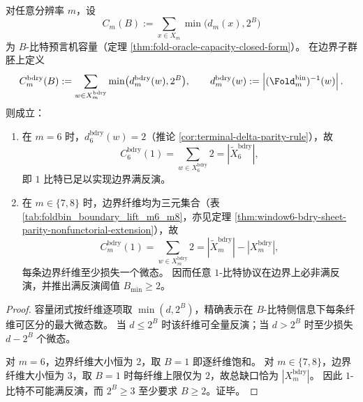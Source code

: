 \begin{proposition}\label{prop:conclusion-boundary-uplift-min-register-by-oracle-capacity}
对任意分辨率 \(m\)，设
\[
C_m(B):=\sum_{x\in X_m}\min\bigl(d_m(x),2^B\bigr)
\]
为 \(B\)-比特预言机容量（定理 \ref{thm:fold-oracle-capacity-closed-form}）。
在边界子群胚上定义
\[
C_m^{\mathrm{bdry}}(B):=\sum_{w\in X_m^{\mathrm{bdry}}}\min\bigl(d_m^{\mathrm{bdry}}(w),2^B\bigr),
\qquad
d_m^{\mathrm{bdry}}(w):=\left|(\Fold_m^{\mathrm{bin}})^{-1}(w)\right|.
\]
则成立：
\begin{enumerate}
  \item 在 \(m=6\) 时，\(d_6^{\mathrm{bdry}}(w)=2\)（推论 \ref{cor:terminal-delta-parity-rule}），故
  \[
  C_6^{\mathrm{bdry}}(1)=\sum_{w\in X_6^{\mathrm{bdry}}}2
  =\left|\widetilde X_6^{\mathrm{bdry}}\right|,
  \]
  即 \(1\) 比特已足以实现边界满反演。
  \item 在 \(m\in\{7,8\}\) 时，边界纤维均为三元集合（表 \ref{tab:foldbin_boundary_lift_m6_m8}，亦见定理 \ref{thm:window6-bdry-sheet-parity-nonfunctorial-extension}），故
  \[
  C_m^{\mathrm{bdry}}(1)=\sum_{w\in X_m^{\mathrm{bdry}}}2
  =\left|\widetilde X_m^{\mathrm{bdry}}\right|-\left|X_m^{\mathrm{bdry}}\right|,
  \]
  每条边界纤维至少损失一个微态。
  因而任意 \(1\)-比特协议在边界上必非满反演，并推出满反演阈值 \(B_{\min}\ge 2\)。
\end{enumerate}
\end{proposition}
\begin{proof}
容量闭式按纤维逐项取 \(\min(d,2^B)\)，精确表示在 \(B\)-比特侧信息下每条纤维可区分的最大微态数。
当 \(d\le 2^B\) 时该纤维可全量反演；当 \(d>2^B\) 时至少损失 \(d-2^B\) 个微态。

对 \(m=6\)，边界纤维大小恒为 \(2\)，取 \(B=1\) 即逐纤维饱和。
对 \(m\in\{7,8\}\)，边界纤维大小恒为 \(3\)，取 \(B=1\) 时每纤维上限仅为 \(2\)，故总缺口恰为 \(|X_m^{\mathrm{bdry}}|\)。
因此 \(1\)-比特不可能满反演，而 \(2^B\ge 3\) 至少要求 \(B\ge 2\)。证毕。
\end{proof}

